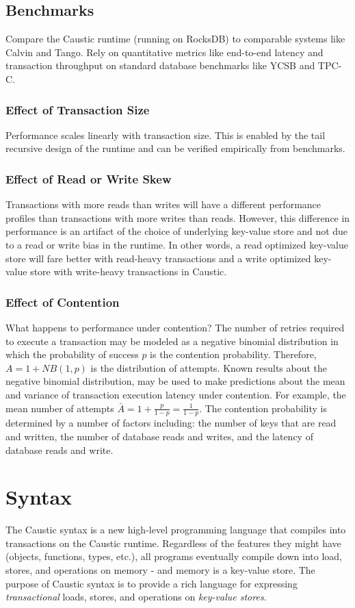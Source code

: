 \documentclass[journal]{../styles/IEEEtran}
\begin{document}
\subsection{Benchmarks}
Compare the Caustic runtime (running on RocksDB) to comparable systems like Calvin and Tango. Rely on quantitative metrics like end-to-end latency and transaction throughput on standard database benchmarks like YCSB and TPC-C.

\subsubsection{Effect of Transaction Size}
Performance scales linearly with transaction size. This is enabled by the tail recursive design of the runtime and can be verified empirically from benchmarks. 

\subsubsection{Effect of Read or Write Skew}
Transactions with more reads than writes will have a different performance profiles than transactions with more writes than reads. However, this difference in performance is an artifact of the choice of underlying key-value store and not due to a read or write bias in the runtime. In other words, a read optimized key-value store will fare better with read-heavy transactions and a write optimized key-value store with write-heavy transactions in Caustic.

\subsubsection{Effect of Contention}
What happens to performance under contention? The number of retries required to execute a transaction may be modeled as a negative binomial distribution in which the probability of success $p$ is the contention probability. Therefore, $A = 1 + NB(1, p)$ is the distribution of attempts. Known results about the negative binomial distribution, may be used to make predictions about the mean and variance of transaction execution latency under contention. For example, the mean number of attempts $\bar{A} = 1 + \frac{p}{1 - p} = \frac{1}{1 - p}$. The contention probability is determined by a number of factors including: the number of keys that are read and written, the number of database reads and writes, and the latency of database reads and write.

\section{Syntax}
The Caustic syntax is a new high-level programming language that compiles into transactions on the Caustic runtime. Regardless of the features they might have (objects, functions, types, etc.), all programs eventually compile down into load, stores, and operations on memory - and memory is a key-value store. The purpose of Caustic syntax is to provide a rich language for expressing \emph{transactional} loads, stores, and operations on \emph{key-value stores}.
\end{document}

